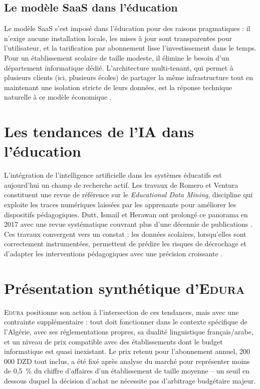 \documentclass[12pt,a4paper,oneside]{report}
\newcommand{\edura}{\textsc{Edura}}
\begin{document}
\subsection{Le modèle SaaS dans l'éducation}

Le modèle \ac{SaaS} s'est imposé dans l'éducation pour des raisons pragmatiques : il n'exige aucune installation locale, les mises à jour sont transparentes pour l'utilisateur, et la tarification par abonnement lisse l'investissement dans le temps. Pour un établissement scolaire de taille modeste, il élimine le besoin d'un département informatique dédié. L'architecture multi-tenant, qui permet à plusieurs clients (ici, plusieurs écoles) de partager la même infrastructure tout en maintenant une isolation stricte de leurs données, est la réponse technique naturelle à ce modèle économique \autocite{walraven2011comparing}.

\section{Les tendances de l'IA dans l'éducation}

L'intégration de l'intelligence artificielle dans les systèmes éducatifs est aujourd'hui un champ de recherche actif. Les travaux de Romero et Ventura \autocite{romero2010educational} constituent une revue de référence sur le \textit{Educational Data Mining}, discipline qui exploite les traces numériques laissées par les apprenants pour améliorer les dispositifs pédagogiques. Dutt, Ismail et Herawan ont prolongé ce panorama en 2017 avec une revue systématique couvrant plus d'une décennie de publications \autocite{dutt2017systematic}. Ces travaux convergent vers un constat : les données scolaires, lorsqu'elles sont correctement instrumentées, permettent de prédire les risques de décrochage et d'adapter les interventions pédagogiques avec une précision croissante \autocite{albreiki2021systematic}.

\section{Présentation synthétique d'\edura{}}

\edura{} positionne son action à l'intersection de ces tendances, mais avec une contrainte supplémentaire : tout doit fonctionner dans le contexte spécifique de l'Algérie, avec ses réglementations propres, sa dualité linguistique français/arabe, et un niveau de prix compatible avec des établissements dont le budget informatique est quasi inexistant. Le prix retenu pour l'abonnement annuel, 200 000 \ac{DZD} tout inclus, a été fixé après analyse du marché pour représenter moins de 0,5~\% du chiffre d'affaires d'un établissement de taille moyenne -- un seuil en dessous duquel la décision d'achat ne nécessite pas d'arbitrage budgétaire majeur.
\end{document}
